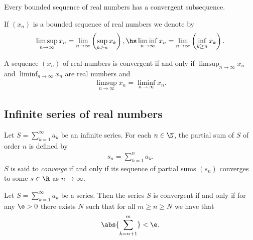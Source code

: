 \documentclass{article}
\begin{document}
\begin{theorem}
    Every bounded sequence of real numbers has a convergent subsequence.
\end{theorem}

\begin{definition}[Notes 1.5]
    If $(x_n)$ is a bounded sequence of real numbers we denote by
    \begin{align*}
        \limsup_{n\to\infty} x_n = \lim_{n\to\infty}\left(\sup_{k\geq n}x_k\right),\hs
        \liminf_{n\to\infty} x_n = \lim_{n\to\infty}\left(\inf_{k\geq n}x_k\right).
    \end{align*}
\end{definition}

\begin{theorem}[Notes 1.6]
    A sequence $(x_n)$ of real numbers is convergent if and only if $\limsup_{n\to\infty}x_n$
    and $\liminf_{n\to\infty}x_n$ are real numbers and
    \begin{align*}
        \limsup_{n\to\infty}x_n =\liminf_{n\to\infty} x_n.
    \end{align*}
\end{theorem}

\subsection{Infinite series of real numbers}

\begin{definition}[Notes 1.6]
    Let $S=\sum_{k=1}^\infty a_k$ be an infinite series. For each $n\in\N$, the partial
    sum of $S$ of order $n$ is defined by
    \begin{align*}
        s_n = \sum_{k=1}^n a_k.
    \end{align*}
    $S$ is said to \emph{converge} if and only if its sequence of partial sums $(s_n)$
    converges to some $s\in\R$ as $n\to\infty$.
\end{definition}

\begin{theorem}
    Let $S=\sum_{k=1}^\infty a_k$ be a series. Then the series $S$ is convergent
    if and only if for any $\e>0$ there exists $N$ such that for all $m\geq n\geq N$
    we have that
    \begin{align*}
        \abs{\sum_{k=n+1}^m}<\e.
    \end{align*}
\end{theorem}
\end{document}
